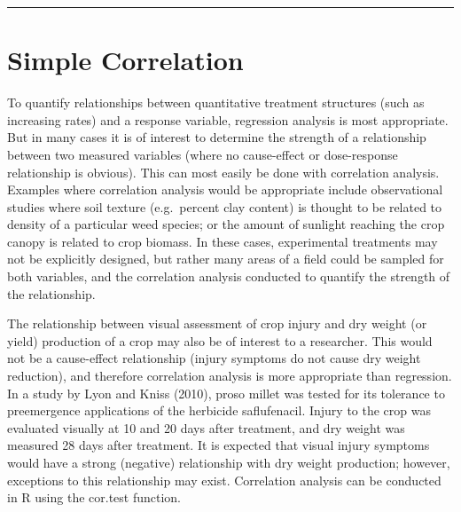 \documentclass[letterpaper,]{book}
\newenvironment{Shaded}{\begin{snugshade}}{\end{snugshade}}
\newcommand{\FloatTok}[1]{\textcolor[rgb]{0.00,0.00,0.81}{#1}}
\newcommand{\KeywordTok}[1]{\textcolor[rgb]{0.13,0.29,0.53}{\textbf{#1}}}
\newcommand{\NormalTok}[1]{#1}
\newcommand{\OperatorTok}[1]{\textcolor[rgb]{0.81,0.36,0.00}{\textbf{#1}}}
\newcommand{\StringTok}[1]{\textcolor[rgb]{0.31,0.60,0.02}{#1}}
\begin{document}
\begin{center}\rule{0.5\linewidth}{0.5pt}\end{center}

\hypertarget{simple-correlation}{%
\chapter{Simple Correlation}\label{simple-correlation}}

To quantify relationships between quantitative treatment structures (such as increasing rates) and a response variable, regression analysis is most appropriate. But in many cases it is of interest to determine the strength of a relationship between two measured variables (where no cause-effect or dose-response relationship is obvious). This can most easily be done with correlation analysis. Examples where correlation analysis would be appropriate include observational studies where soil texture (e.g.~percent clay content) is thought to be related to density of a particular weed species; or the amount of sunlight reaching the crop canopy is related to crop biomass. In these cases, experimental treatments may not be explicitly designed, but rather many areas of a field could be sampled for both variables, and the correlation analysis conducted to quantify the strength of the relationship.

The relationship between visual assessment of crop injury and dry weight (or yield) production of a crop may also be of interest to a researcher. This would not be a cause-effect relationship (injury symptoms do not cause dry weight reduction), and therefore correlation analysis is more appropriate than regression. In a study by Lyon and Kniss (2010), proso millet was tested for its tolerance to preemergence applications of the herbicide saflufenacil. Injury to the crop was evaluated visually at 10 and 20 days after treatment, and dry weight was measured 28 days after treatment. It is expected that visual injury symptoms would have a strong (negative) relationship with dry weight production; however, exceptions to this relationship may exist. Correlation analysis can be conducted in R using the cor.test function.

\begin{Shaded}
\end{Shaded}
\end{document}
